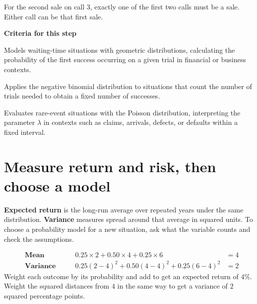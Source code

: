 For the second sale on call 3, exactly one of the first two calls must be a sale. Either call can be that first sale.

\textbf{Criteria for this step}
\begin{stepcriteria}
\item[C5] Models waiting-time situations with geometric distributions, calculating the probability of the first success occurring on a given trial in financial or business contexts.
\item[C6] Applies the negative binomial distribution to situations that count the number of trials needed to obtain a fixed number of successes.
\item[C7] Evaluates rare-event situations with the Poisson distribution, interpreting the parameter \(\lambda\) in contexts such as claims, arrivals, defects, or defaults within a fixed interval.
\end{stepcriteria}

\clearpage
\section{Measure return and risk, then choose a model}

\textbf{Expected return} is the long-run average over repeated years under the same distribution. \textbf{Variance} measures spread around that average in squared units. To choose a probability model for a new situation, ask what the variable counts and check the assumptions.


\[
\begin{alignedat}{2}
&\textbf{Mean} &\qquad 0.25\times 2+0.50\times 4+0.25\times 6 &=4\\
&\textbf{Variance} &\qquad 0.25(2-4)^2+0.50(4-4)^2+0.25(6-4)^2 &=2
\end{alignedat}
\]
Weight each outcome by its probability and add to get an expected return of \(4\%\). Weight the squared distances from \(4\) in the same way to get a variance of \(2\) squared percentage points.

